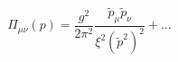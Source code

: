 \begin{equation} \Pi_{\mu \nu}(p)= \frac{g^2}{2 \pi^2}
 \frac{\tilde{p}_{\mu}\tilde{p}_{\nu}}{\xi^2(\tilde{p}^2)^2}+ \ldots
 \label{6} \end{equation}

